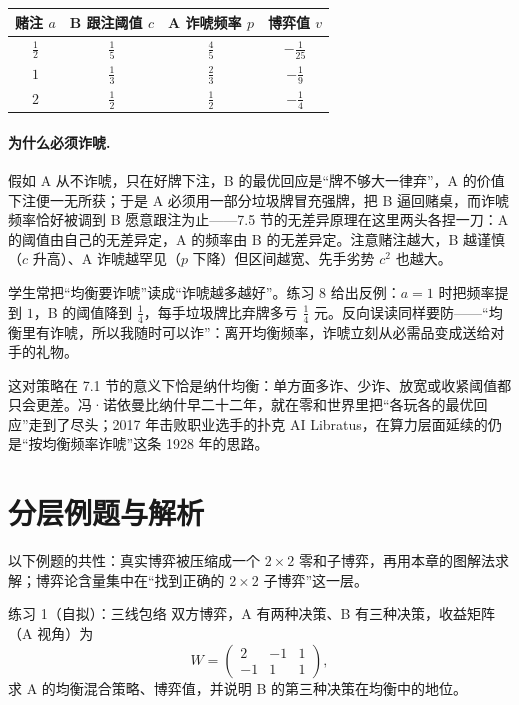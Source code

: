 \documentclass[UTF8,a4paper,11pt,oneside,openany,fontset=fandol]{ctexbook}
\theoremstyle{definition}
\begin{document}
\begin{center}
\begin{tabular}{cccc}
\toprule
赌注 $a$ & B 跟注阈值 $c$ & A 诈唬频率 $p$ & 博弈值 $v$\\
\midrule
$\tfrac12$ & $\tfrac15$ & $\tfrac45$ & $-\tfrac1{25}$\\
$1$ & $\tfrac13$ & $\tfrac23$ & $-\tfrac19$\\
$2$ & $\tfrac12$ & $\tfrac12$ & $-\tfrac14$\\
\bottomrule
\end{tabular}
\end{center}

\paragraph{为什么必须诈唬.} 假如 A 从不诈唬，只在好牌下注，B 的最优回应是“牌不够大一律弃”，A 的价值下注便一无所获；于是 A 必须用一部分垃圾牌冒充强牌，把 B 逼回赌桌，而诈唬频率恰好被调到 B 愿意跟注为止——7.5 节的无差异原理在这里两头各捏一刀：A 的阈值由自己的无差异定，A 的频率由 B 的无差异定。注意赌注越大，B 越谨慎（$c$ 升高）、A 诈唬越罕见（$p$ 下降）但区间越宽、先手劣势 $c^{2}$ 也越大。

\begin{pitfall}[诈唬不是越多越好]
学生常把“均衡要诈唬”读成“诈唬越多越好”。练习 8 给出反例：$a=1$ 时把频率提到 $1$，B 的阈值降到 $\tfrac14$，每手垃圾牌比弃牌多亏 $\tfrac14$ 元。反向误读同样要防——“均衡里有诈唬，所以我随时可以诈”：离开均衡频率，诈唬立刻从必需品变成送给对手的礼物。
\end{pitfall}

这对策略在 7.1 节的意义下恰是纳什均衡：单方面多诈、少诈、放宽或收紧阈值都只会更差。冯·诺依曼比纳什早二十二年，就在零和世界里把“各玩各的最优回应”走到了尽头；2017 年击败职业选手的扑克 AI Libratus，在算力层面延续的仍是“按均衡频率诈唬”这条 1928 年的思路。

\section{分层例题与解析}

以下例题的共性：真实博弈被压缩成一个 $2\times2$ 零和子博弈，再用本章的图解法求解；博弈论含量集中在“找到正确的 $2\times2$ 子博弈”这一层。


\begin{problem}{练习 1（自拟）：三线包络}
双方博弈，A 有两种决策、B 有三种决策，收益矩阵（A 视角）为
\[
 W=\begin{pmatrix}2&-1&1\\-1&1&1\end{pmatrix},
\]
求 A 的均衡混合策略、博弈值，并说明 B 的第三种决策在均衡中的地位。
\end{problem}
\end{document}
